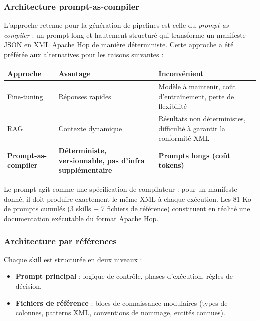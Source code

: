\documentclass[a4paper,12pt]{article}
\begin{document}
\subsubsection{Architecture prompt-as-compiler}

L'approche retenue pour la génération de pipelines est celle du \textit{prompt-as-compiler} : un prompt long et hautement structuré qui transforme un manifeste JSON en XML Apache Hop de manière déterministe. Cette approche a été préférée aux alternatives pour les raisons suivantes :

\begin{center}
\begin{tabular}{|p{}|p{}|p{}|}
\hline
\textbf{Approche} & \textbf{Avantage} & \textbf{Inconvénient} \\
\hline
Fine-tuning & Réponses rapides & Modèle à maintenir, coût d'entraînement, perte de flexibilité \\
\hline
RAG & Contexte dynamique & Résultats non déterministes, difficulté à garantir la conformité XML \\
\hline
\textbf{Prompt-as-compiler} & \textbf{Déterministe, versionnable, pas d'infra supplémentaire} & \textbf{Prompts longs (coût tokens)} \\
\hline
\end{tabular}
\end{center}

Le prompt agit comme une spécification de compilateur : pour un manifeste donné, il doit produire exactement le même XML à chaque exécution. Les 81 Ko de prompts cumulés (3 skills + 7 fichiers de référence) constituent en réalité une documentation exécutable du format Apache Hop.

\subsubsection{Architecture par références}

Chaque skill est structurée en deux niveaux :

\begin{itemize}
  \item \textbf{Prompt principal} : logique de contrôle, phases d'exécution, règles de décision.
  \item \textbf{Fichiers de référence} : blocs de connaissance modulaires (types de colonnes, patterns XML, conventions de nommage, entités connues).
\end{itemize}
\end{document}
